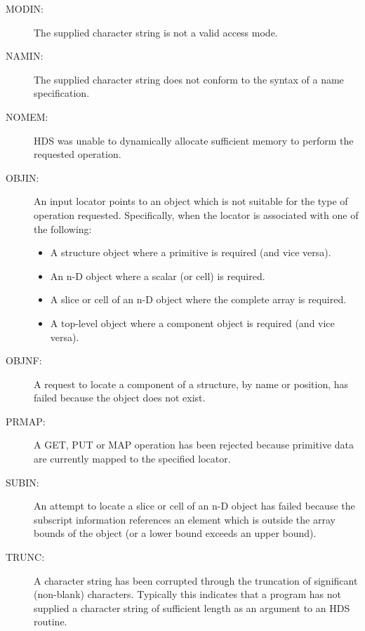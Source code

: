 \documentclass[11pt]{article}
\newcommand{\htmlref}[2]{#1}
\begin{document}
\begin{description}
\begin{itemize}
\end{itemize}

\item [MODIN:]
The supplied character string is not a valid access mode.

\item [NAMIN:]
The supplied character string does not conform to the syntax of a \htmlref{name}{sect:name}
specification.

\item [NOMEM:]
HDS was unable to dynamically allocate sufficient memory to perform the
requested operation.

\item [OBJIN:]
An input \htmlref{locator}{sect:locators} points to an object which is not suitable for the type of
operation requested. Specifically, when the locator is associated with one of
the following:

\begin{itemize}

\item A structure object where a primitive is required (and vice versa).

\item An n-D object where a scalar (or cell) is required.

\item A slice or cell of an n-D object where the complete array is required.

\item A top-level object where a component object is required (and vice versa).

\end{itemize}

\item [OBJNF:]
A request to locate a component of a structure, by \htmlref{name}{sect:name} or position, has failed
because the object does not exist.

\item [PRMAP:]
A GET, PUT or MAP operation has been rejected because primitive data are
currently mapped to the specified \htmlref{locator}{sect:locators}.

\item [SUBIN:]
An attempt to locate a slice or cell of an n-D object has failed because the
subscript information references an element which is outside the array bounds
of the object (or a lower bound exceeds an upper bound).

\item [TRUNC:]
A character string has been corrupted through the truncation of significant
(non-blank) characters. Typically this indicates that a program has not
supplied a character string of sufficient length as an argument to an HDS
routine.


\end{description}
\end{document}
